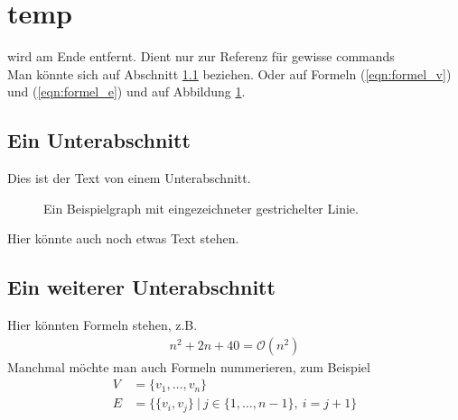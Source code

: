 \documentclass[a4paper]{article}
\def\O{\mathcal{O}}
\theoremstyle{definition}
\theoremstyle{remark}
\begin{document}
	
	
	
	

	
	\section{temp}
	wird am Ende entfernt. Dient nur zur Referenz für gewisse commands\\
	Man könnte sich auf Abschnitt \ref{sec:einunterabschnitt} beziehen. Oder auf Formeln
	(\ref{eqn:formel_v}) und (\ref{eqn:formel_e}) und auf Abbildung \ref{fig:bspgraph}.	
	
	\subsection{Ein Unterabschnitt}
	\label{sec:einunterabschnitt}
	Dies ist der Text von einem Unterabschnitt.
	
	\begin{figure}[h]
		\begin{center}
			\caption{Ein Beispielgraph mit eingezeichneter gestrichelter Linie.}
			\label{fig:bspgraph}
		\end{center}
	\end{figure}
	
	\noindent
	Hier könnte auch noch etwas Text stehen.
	
	
	\subsection{Ein weiterer Unterabschnitt}
	Hier könnten Formeln stehen, z.B.
	\begin{align*}
		n^{2} + 2n + 40 = \O(n^{2})
	\end{align*}
	Manchmal möchte man auch Formeln nummerieren, zum Beispiel
	\begin{align}
		V &= \{v_1, \dots, v_n\} \label{eqn:formel_v}\\
		E &= \{\{v_{i}, v_{j}\}\ |\ j \in \{1, \dots, n-1\},\ i = j+1\} \label{eqn:formel_e}
	\end{align}
	
\end{document}
